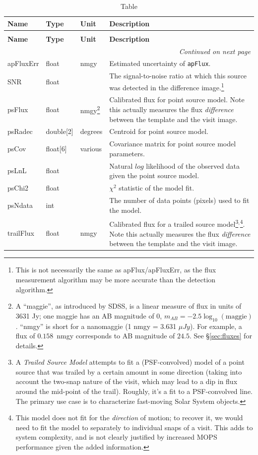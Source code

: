 \documentclass[SE,lsstdraft,toc]{lsstdoc}
\newenvironment{schema}[3]{%
\setlength\LTleft{0pt}
\setlength\LTright{\fill}
\begin{longtable}{p{0.2\textwidth}p{0.14\textwidth}p{0.14\textwidth}p{0.41\textwidth}}

\caption[#1]{#2\label{#3}}\\

\hline \textbf{Name} & \textbf{Type} & \textbf{Unit} & \textbf{Description}\\ \hline
\endfirsthead

\caption[#1]{#2}\\

\hline \textbf{Name} & \textbf{Type} & \textbf{Unit} & \textbf{Description}\\ \hline
\endhead

\hline \multicolumn{4}{r}{\emph{Continued on next page}} \\
\endfoot

\hline\hline
\endlastfoot
}{%
\hline
\end{longtable}
}
\begin{document}
\begin{schema}{\DIASource Table}{\DIASource Table}{tbl:diasourceTable}
apFluxErr & float & nmgy &  Estimated uncertainty of \texttt{apFlux}. \\

SNR & float & ~ & The signal-to-noise ratio at which this source was detected in the difference image.\footnote{This is not necessarily the same as apFlux/apFluxErr, as the flux measurement algorithm may be more accurate than the detection algorithm.} \\

psFlux & float & nmgy\footnote{A ``maggie'', as introduced by SDSS, is a linear measure of flux in units of 3631 Jy; one maggie has an AB magnitude of 0, $m_{AB}=-2.5\log_{10}(\mathrm{maggie})$. ``nmgy'' is short for a nanomaggie (1 nmgy = 3.631 $\mu Jy$). For example, a flux of $0.158$~nmgy corresponds to AB magnitude of $24.5$. See \S \ref{sec:fluxes} for details.} & Calibrated flux for point source model. Note this actually measures the flux \emph{difference} between the template and the visit image. \\

psRadec & double[2] & degrees & Centroid for point source model. \\

psCov & float[6] & various & Covariance matrix for point source model parameters. \\

psLnL & float & ~ & Natural $log$ likelihood of the observed data given the point source model. \\

psChi2 & float & ~ & $\chi^2$ statistic of the model fit. \\

psNdata & int & ~ & The number of data points (pixels) used to fit the model. \\

trailFlux & float & nmgy & Calibrated flux for a trailed source model\footnote{A \emph{Trailed Source Model} attempts to fit a (PSF-convolved) model of a point source that was trailed by a certain amount in some direction (taking into account the two-snap nature of the visit, which may lead to a dip in flux around the mid-point of the trail). Roughly, it's a fit to a PSF-convolved line. The primary use case is to characterize fast-moving Solar System objects.}$^,$\footnote{This model does not fit for the \emph{direction} of motion; to recover it, we would need to fit the model to separately to individual snaps of a visit. This adds to system complexity, and is not clearly justified by increased MOPS performance given the added information.}. Note this actually measures the flux \emph{difference} between the template and the visit image. \\


\end{schema}
\end{document}
